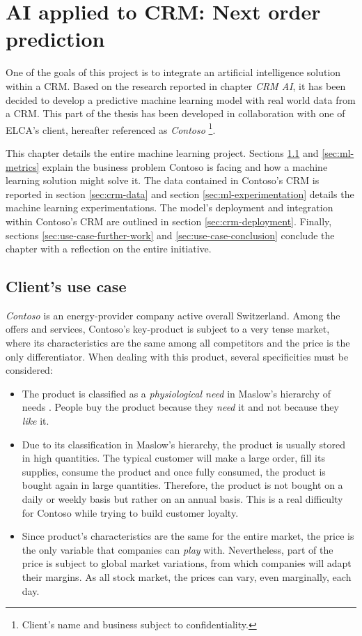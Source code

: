 \chapter{AI applied to CRM: Next order prediction} \label{chapter:use-case}

One of the goals of this project is to integrate an artificial intelligence solution within a CRM. Based on the research reported in chapter \textit{CRM AI}, it has been decided to develop a predictive machine learning model with real world data from a CRM. This part of the thesis has been developed in collaboration with one of ELCA's client, hereafter referenced as \textit{Contoso} \footnote{Client's name and business subject to confidentiality.}.

This chapter details the entire machine learning project. Sections \ref{sec:use-case} and \ref{sec:ml-metrics} explain the business problem Contoso is facing and how a machine learning solution might solve it. The data contained in Contoso's CRM is reported in section \ref{sec:crm-data} and section \ref{sec:ml-experimentation} details the machine learning experimentations. The model's deployment and integration within Contoso's CRM are outlined in section \ref{sec:crm-deployment}. Finally, sections \ref{sec:use-case-further-work} and \ref{sec:use-case-conclusion} conclude the chapter with a reflection on the entire initiative.

\section{Client's use case} \label{sec:use-case}
\textit{Contoso} is an energy-provider company active overall Switzerland. Among the offers and services, Contoso's key-product is subject to a very tense market, where its characteristics are the same among all competitors and the price is the only differentiator. When dealing with this product, several specificities must be considered:
\begin{itemize}
\item The product is classified as a \textit{physiological need} in Maslow's hierarchy of needs \cite{def:Maslow}. People buy the product because they \textit{need} it and not because they \textit{like} it.
\item Due to its classification in Maslow's hierarchy, the product is usually stored in high quantities. The typical customer will make a large order, fill its supplies, consume the product and once fully consumed, the product is bought again in large quantities. Therefore, the product is not bought on a daily or weekly basis but rather on an annual basis. This is a real difficulty for Contoso while trying to build customer loyalty.
\item Since product's characteristics are the same for the entire market, the price is the only variable that companies can \textit{play} with. Nevertheless, part of the price is subject to global market variations, from which companies will adapt their margins. As all stock market, the prices can vary, even marginally, each day.
\end{itemize}

